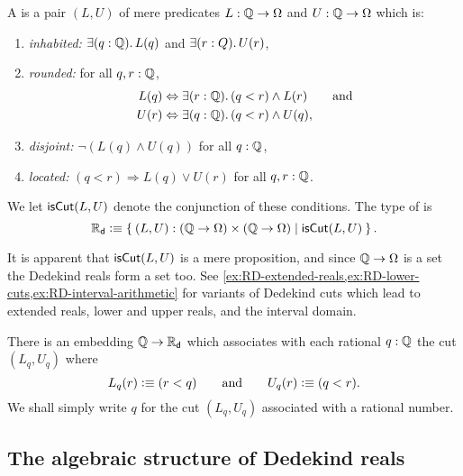 \begin{defn} \label{defn:dedekind-reals}
  A 
  is a pair $(L, U)$ of mere predicates $L : \mathbb{Q} \to \Omega$ and $U
  : \mathbb{Q} \to \Omega$ which is:
  \begin{enumerate}
  \item \emph{inhabited:} $\exis{q : \Q} L(q)$ and $\exis{r : Q} U(r)$,
  \item \emph{rounded:} for all $q, r : \mathbb{Q}$,
    \begin{align*}
      L(q) &\Leftrightarrow \exis{r : \Q} (q < r) \land L(r)
      \qquad\text{and}\\
      U(r) &\Leftrightarrow \exis{q : \Q} (q < r) \land U(q),
    \end{align*}
  \item \emph{disjoint:} $\lnot (L(q) \land U(q))$ for all $q : \mathbb{Q}$,
  \item \emph{located:} $(q < r) \Rightarrow L(q) \lor U(r)$ for all $q, r : \mathbb{Q}$.
  \end{enumerate}
  We let $\mathsf{isCut}(L, U)$ denote the conjunction of these conditions. The type of
   is
  \begin{equation*}
    \RD \defeq \setof{ (L, U) : (\Q \to \Omega) \times (\Q \to \Omega) | \dcut(L,U)}.
  \end{equation*}
\end{defn}

It is apparent that $\mathsf{isCut}(L, U)$ is a mere proposition, and since $\mathbb{Q} \to \Omega$ is a
set the Dedekind reals form a set too. See
\autoref{ex:RD-extended-reals,ex:RD-lower-cuts,ex:RD-interval-arithmetic} for variants of
Dedekind cuts which lead to extended reals, lower and upper reals, and the interval
domain.

There is an embedding $\mathbb{Q} \to \mathbb{R}_\mathsf{d}$ which associates with each rational $q : \mathbb{Q}$ the cut
$(L_q, U_q)$ where
%
\begin{equation*}
  L_q(r) \vcentcolon\equiv (r < q)
  \qquad\text{and}\qquad
  U_q(r) \vcentcolon\equiv (q < r).
\end{equation*}
%
We shall simply write $q$ for the cut $(L_q, U_q)$ associated with a rational number.

\subsection{The algebraic structure of Dedekind reals}
\label{sec:algebr-struct-dedek}

